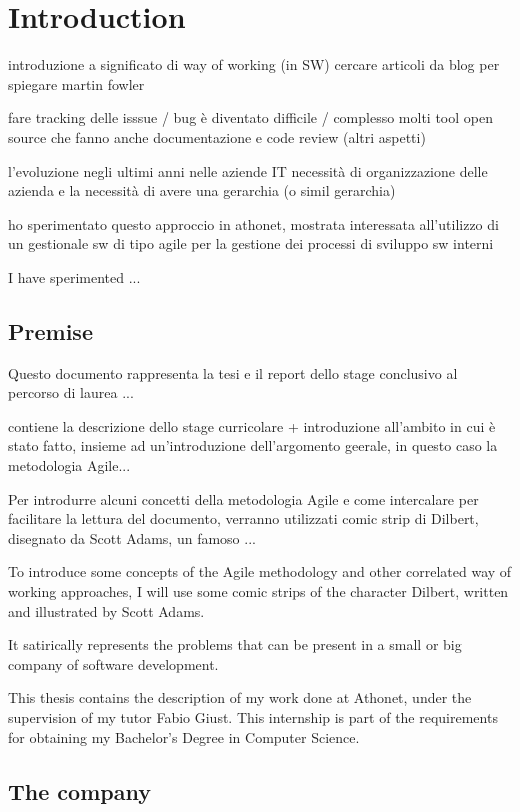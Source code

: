 \chapter{Introduction}
\label{introduction}

introduzione a significato di way of working (in SW)
	cercare articoli da blog per spiegare
	martin fowler		

fare tracking delle isssue / bug è diventato difficile / complesso
	molti tool open source che fanno anche documentazione e code review (altri aspetti)

l'evoluzione negli ultimi anni nelle aziende IT
	necessità di organizzazione delle azienda e la necessità di avere una gerarchia (o simil gerarchia)

ho sperimentato questo approccio in athonet, mostrata interessata all'utilizzo di un gestionale sw di tipo agile per la gestione dei processi di sviluppo sw interni

I have sperimented ... 

\section{Premise}

	Questo documento rappresenta la tesi e il report dello stage conclusivo al percorso di laurea ...
	
	contiene la descrizione dello stage curricolare + introduzione all'ambito in cui è stato fatto, insieme ad un'introduzione dell'argomento geerale, in questo caso la metodologia Agile...

	Per introdurre alcuni concetti della metodologia Agile e come intercalare per facilitare la lettura del documento, verranno utilizzati comic strip di Dilbert, disegnato da Scott Adams, un famoso ...
	
	To introduce some concepts of the Agile methodology and other correlated way of working approaches, I will use some comic strips of the character Dilbert, written and illustrated by Scott Adams.
	
	It satirically represents the problems that can be present in a small or big company of software development.
	
	This thesis contains the description of my work done at Athonet, under the supervision of my tutor Fabio Giust.
	This internship is part of the requirements for obtaining my Bachelor's Degree in Computer Science.
	
\section{The company}

